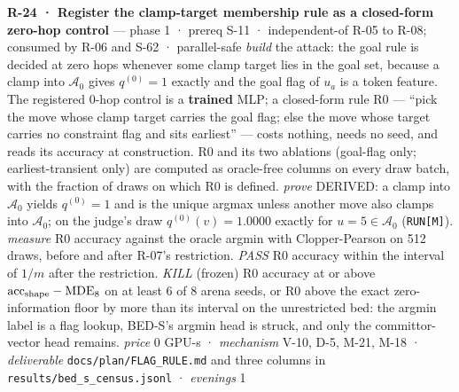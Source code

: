 \documentclass[11pt,a4paper]{article}
\theoremstyle{plain}
\theoremstyle{definition}
\theoremstyle{remark}
\begin{document}
\textbf{R-24 · Register the clamp-target membership rule as a
closed-form zero-hop control} --- phase 1 · prereq S-11 · independent-of
R-05 to R-08; consumed by R-06 and S-62 · parallel-safe \emph{build} the
attack: the goal rule is decided at zero hops whenever some clamp target
lies in the goal set, because a clamp into \(\mathcal{A}_0\) gives
\(q^{(0)}=1\) exactly and the goal flag of \(u_a\) is a token feature.
The registered 0-hop control is a \textbf{trained} MLP; a closed-form
rule R0 --- ``pick the move whose clamp target carries the goal flag;
else the move whose target carries no constraint flag and sits
earliest'' --- costs nothing, needs no seed, and reads its accuracy at
construction. R0 and its two ablations (goal-flag only;
earliest-transient only) are computed as oracle-free columns on every
draw batch, with the fraction of draws on which R0 is defined.
\emph{prove} DERIVED: a clamp into \(\mathcal{A}_0\) yields
\(q^{(0)}=1\) and is the unique argmax unless another move also clamps
into \(\mathcal{A}_0\); on the judge's draw \(q^{(0)}(v)=1.0000\)
exactly for \(u=5\in\mathcal{A}_0\) (\texttt{RUN{[}M{]}}).
\emph{measure} R0 accuracy against the oracle argmin with
Clopper-Pearson on 512 draws, before and after R-07's restriction.
\emph{PASS} R0 accuracy within the interval of \(1/m\) after the
restriction. \emph{KILL} (frozen) R0 accuracy at or above
\(\mathrm{acc}_{\rm shape}-\mathrm{MDE}_8\) on at least 6 of 8 arena
seeds, or R0 above the exact zero-information floor by more than its
interval on the unrestricted bed: the argmin label is a flag lookup,
BED-S's argmin head is struck, and only the committor-vector head
remains. \emph{price} \(0\) GPU-s · \emph{mechanism} V-10, D-5, M-21,
M-18 · \emph{deliverable} \texttt{docs/plan/FLAG\_RULE.md} and three
columns in \texttt{results/bed\_s\_census.jsonl} · \emph{evenings} 1
\end{document}
